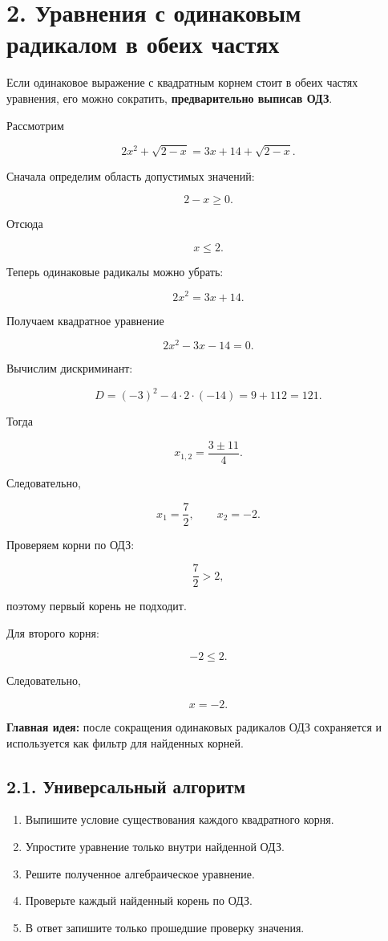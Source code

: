 \documentclass[a4paper,12pt]{article}
\newcommand{\important}[1]{\textcolor{darkaccent}{\textbf{#1}}}
\begin{document}
\section*{\textcolor{darkaccent}{
2. Уравнения с одинаковым радикалом в обеих частях
}}

Если одинаковое выражение с квадратным корнем
стоит в обеих частях уравнения, его можно сократить,
\important{предварительно выписав ОДЗ}.

Рассмотрим

\[
2x^2+\sqrt{2-x}
=
3x+14+\sqrt{2-x}.
\]

Сначала определим область допустимых значений:

\[
2-x\ge0.
\]

Отсюда

\[
x\le2.
\]

Теперь одинаковые радикалы можно убрать:

\[
2x^2=3x+14.
\]

Получаем квадратное уравнение

\[
2x^2-3x-14=0.
\]

Вычислим дискриминант:

\[
D=(-3)^2-4\cdot2\cdot(-14)
=9+112
=121.
\]

Тогда

\[
x_{1,2}
=
\frac{3\pm11}{4}.
\]

Следовательно,

\[
x_1=\frac72,
\qquad
x_2=-2.
\]

Проверяем корни по ОДЗ:

\[
\frac72>2,
\]

поэтому первый корень не подходит.

Для второго корня:

\[
-2\le2.
\]

Следовательно,

\[
\boxed{x=-2}.
\]

\important{Главная идея:}
после сокращения одинаковых радикалов ОДЗ сохраняется
и используется как фильтр для найденных корней.

\subsection*{2.1. Универсальный алгоритм}

\begin{enumerate}

\item
Выпишите условие существования каждого квадратного корня.

\item
Упростите уравнение только внутри найденной ОДЗ.

\item
Решите полученное алгебраическое уравнение.

\item
Проверьте каждый найденный корень по ОДЗ.

\item
В ответ запишите только прошедшие проверку значения.

\end{enumerate}
\end{document}
